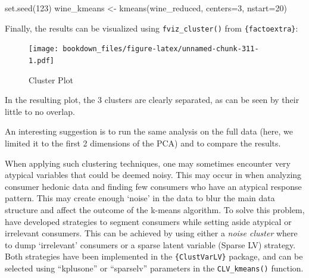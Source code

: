 \documentclass[
]{krantz}
\makeatletter
\newenvironment{Shaded}{\begin{snugshade}}{\end{snugshade}}
\newcommand{\AttributeTok}[1]{\textcolor[rgb]{0.61,0.61,0.61}{#1}}
\newcommand{\ConstantTok}[1]{\textcolor[rgb]{0,0,0}{#1}}
\newcommand{\DecValTok}[1]{\textcolor[rgb]{0.06,0.06,0.06}{#1}}
\newcommand{\FunctionTok}[1]{\textcolor[rgb]{0,0,0}{#1}}
\newcommand{\NormalTok}[1]{#1}
\newcommand{\OtherTok}[1]{\textcolor[rgb]{0.37,0.37,0.37}{#1}}
\newcommand{\SpecialCharTok}[1]{\textcolor[rgb]{0,0,0}{#1}}
\newcommand{\StringTok}[1]{\textcolor[rgb]{0.5,0.5,0.5}{#1}}
\renewenvironment{quote}{\begin{VF}}{\end{VF}}
\newenvironment{kframe}{%
\medskip{}
\setlength{\fboxsep}{.8em}
 \def\at@end@of@kframe{}%
 \ifinner\ifhmode%
  \def\at@end@of@kframe{\end{minipage}}%
  \begin{minipage}{\columnwidth}%
 \fi\fi%
 \def\FrameCommand##1{\hskip\@totalleftmargin \hskip-\fboxsep
 \colorbox{shadecolor}{##1}\hskip-\fboxsep
     \hskip-\linewidth \hskip-\@totalleftmargin \hskip\columnwidth}%
 \MakeFramed {\advance\hsize-\width
   \@totalleftmargin\z@ \linewidth\hsize
   \@setminipage}}%
 {\par\unskip\endMakeFramed%
 \at@end@of@kframe}
\renewenvironment{Shaded}{\begin{kframe}}{\end{kframe}}
\makeatother
\begin{document}
\begin{Shaded}
\begin{Highlighting}[]
\FunctionTok{set.seed}\NormalTok{(}\DecValTok{123}\NormalTok{)}
\NormalTok{wine\_kmeans }\OtherTok{\textless{}{-}} \FunctionTok{kmeans}\NormalTok{(wine\_reduced, }\AttributeTok{centers=}\DecValTok{3}\NormalTok{, }\AttributeTok{nstart=}\DecValTok{20}\NormalTok{)}
\end{Highlighting}
\end{Shaded}

Finally, the results can be visualized using \texttt{fviz\_cluster()} from \texttt{\{factoextra\}}:

\begin{Shaded}
\end{Shaded}

\begin{figure}
\centering
\texttt{[image: bookdown\_files/figure-latex/unnamed-chunk-311-1.pdf]}
\caption{\label{fig:unnamed-chunk-311}Cluster Plot}
\end{figure}

In the resulting plot, the 3 clusters are clearly separated, as can be seen by their little to no overlap.

\begin{quote}
An interesting suggestion is to run the same analysis on the full data (here, we limited it to the first 2 dimensions of the PCA) and to compare the results.
\end{quote}

When applying such clustering techniques, one may sometimes encounter very atypical variables that could be deemed noisy. This may occur in when analyzing consumer hedonic data and finding few consumers who have an atypical response pattern. This may create enough `noise' in the data to blur the main data structure and affect the outcome of the k-means algorithm. To solve this problem, \citet{vigneau2016} have developed strategies to segment consumers while setting aside atypical or irrelevant consumers. This can be achieved by using either a \emph{noise cluster} where to dump `irrelevant' consumers or a sparse latent variable (Sparse LV) strategy. Both strategies have been implemented in the \texttt{\{ClustVarLV\}} package, and can be selected using ``kplusone'' or ``sparselv'' parameters in the \texttt{CLV\_kmeans()} function.
\end{document}
